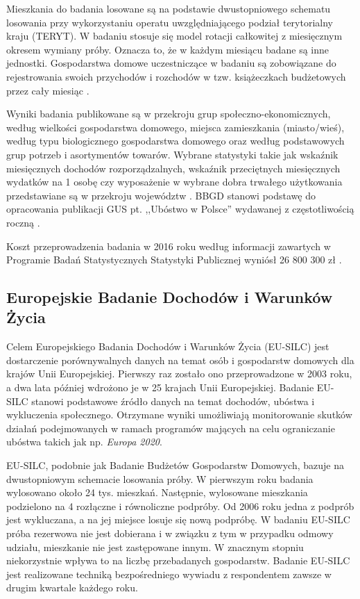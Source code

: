 Mieszkania do badania losowane są na podstawie dwustopniowego schematu losowania przy wykorzystaniu operatu uwzględniającego podział terytorialny kraju (TERYT). W badaniu stosuje się model rotacji całkowitej z miesięcznym okresem wymiany próby. Oznacza to, że w każdym miesiącu badane są inne jednostki. Gospodarstwa domowe uczestniczące w badaniu są zobowiązane do rejestrowania swoich przychodów i rozchodów w tzw. książeczkach budżetowych przez cały miesiąc \citep{bbgd_met2011}.

Wyniki badania publikowane są w przekroju grup społeczno-ekonomicznych, według wielkości gospodarstwa domowego, miejsca zamieszkania (miasto/wieś), według typu biologicznego gospodarstwa domowego oraz według podstawowych grup potrzeb i asortymentów towarów. Wybrane statystyki takie jak wskaźnik miesięcznych dochodów rozporządzalnych, wskaźnik przeciętnych miesięcznych wydatków na 1 osobę czy wyposażenie w wybrane dobra trwałego użytkowania przedstawiane są w przekroju województw \citep{bbgd2016}. BBGD stanowi podstawę do opracowania publikacji GUS pt. ,,Ubóstwo w Polsce'' wydawanej z częstotliwością roczną \citep{ubostwo-gus2015}.

Koszt przeprowadzenia badania w 2016 roku według informacji zawartych w Programie Badań Statystycznych Statystyki Publicznej wyniósł 26 800 300 zł \citep{pbs2015}.

\subsection{Europejskie Badanie Dochodów i Warunków Życia}

Celem Europejskiego Badania Dochodów i Warunków Życia (EU-SILC) jest dostarczenie porównywalnych danych na temat osób i gospodarstw domowych dla krajów Unii Europejskiej. Pierwszy raz zostało ono przeprowadzone w 2003 roku, a dwa lata później wdrożono je w 25 krajach Unii Europejskiej. Badanie EU-SILC stanowi podstawowe źródło danych na temat dochodów, ubóstwa i wykluczenia społecznego. Otrzymane wyniki umożliwiają monitorowanie skutków działań podejmowanych w ramach programów mających na celu ograniczanie ubóstwa takich jak np. \textit{Europa 2020}. 

EU-SILC, podobnie jak Badanie Budżetów Gospodarstw Domowych, bazuje na dwustopniowym schemacie losowania próby. W pierwszym roku badania wylosowano około 24 tys. mieszkań. Następnie, wylosowane mieszkania podzielono na 4 rozłączne i równoliczne podpróby. Od 2006 roku jedna z podprób jest wykluczana, a na jej miejsce losuje się nową podpróbę. W badaniu EU-SILC próba rezerwowa nie jest dobierana i w związku z tym w przypadku odmowy udziału, mieszkanie nie jest zastępowane innym. W znacznym stopniu niekorzystnie wpływa to na liczbę przebadanych gospodarstw. Badanie EU-SILC jest realizowane techniką bezpośredniego wywiadu z respondentem zawsze w drugim kwartale każdego roku.


